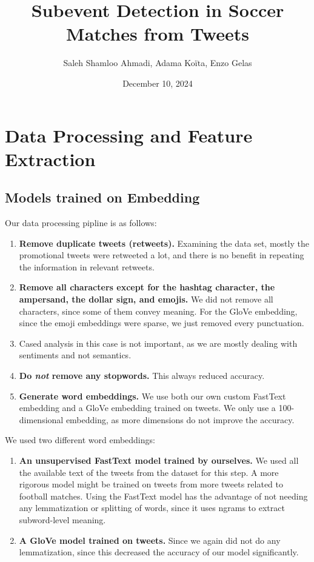 \documentclass[twocolumn]{article}
\title{Subevent Detection in Soccer Matches from Tweets}
\author{Saleh Shamloo Ahmadi, Adama Koïta, Enzo Gelas}
\date{December 10, 2024}
\begin{document}
\maketitle
\section{Data Processing and Feature Extraction}
\subsection{Models trained on Embedding}
Our data processing pipline is as follows:
\begin{enumerate}
    \item \textbf{Remove duplicate tweets (retweets).} Examining the data set, mostly the
        promotional tweets were retweeted a lot, and there is no benefit in repeating the
        information in relevant retweets.
    \item \textbf{Remove all characters except for the hashtag character, the ampersand, the dollar
        sign, and emojis.} We did not remove all characters, since some of them convey meaning. For
        the GloVe embedding, since the emoji embeddings were sparse, we just removed every
        punctuation.
    \item {} Cased analysis in this case is not important, as we are mostly
        dealing with sentiments and not semantics.
    \item \textbf{Do \emph{not} remove any stopwords.} This always reduced accuracy.
    \item \textbf{Generate word embeddings.} We use both our own custom FastText embedding and a
        GloVe embedding trained on tweets. We only use a 100-dimensional embedding, as more
        dimensions do not improve the accuracy.
\end{enumerate}

We used two different word embeddings:
\begin{enumerate}
    \item \textbf{An unsupervised FastText\cite{bojanowski2016enriching} model trained by
        ourselves.} We used all the available text of the tweets from the dataset for this step.
        A more rigorous model might be trained on tweets from more tweets related to football
        matches. Using the FastText model has the advantage of not needing any lemmatization or
        splitting of words, since it uses ngrams to extract subword-level meaning.
    \item \textbf{A GloVe\cite{pennington2014glove} model trained on tweets.} Since we again did
        not do any lemmatization, since this decreased the accuracy of our model significantly.
\end{enumerate}
\end{document}
